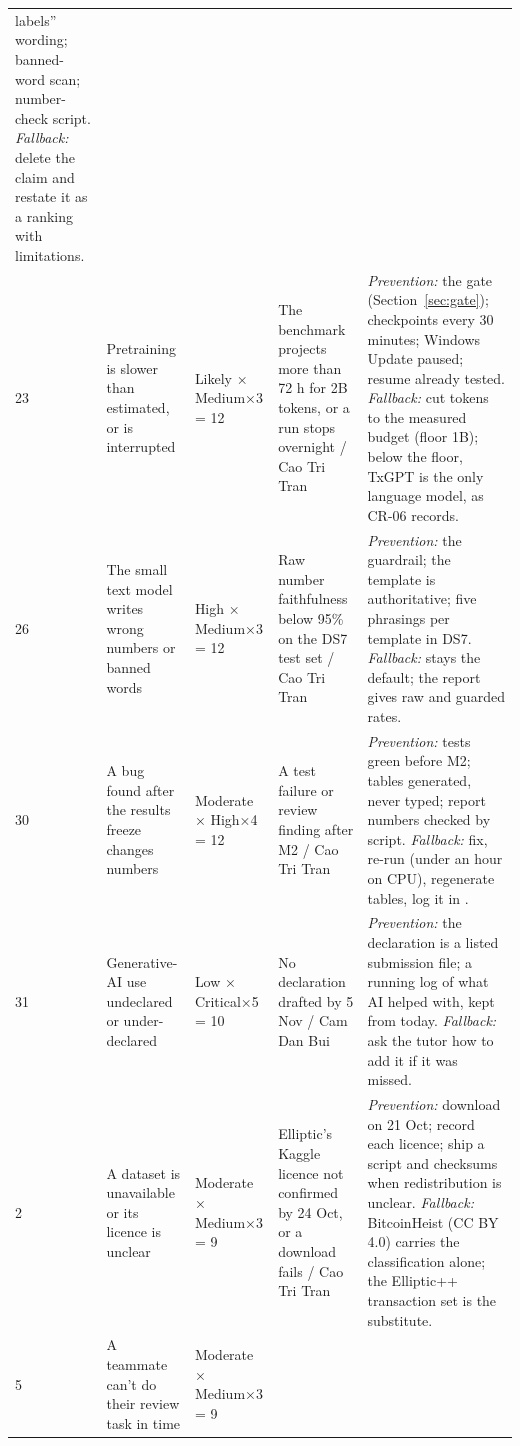 {\begin{longtable}{@{}L{0.7cm}L{3.2cm}L{2.0cm}L{3.4cm}L{4.6cm}@{}}
labels'' wording; banned-word scan; number-check script. \textit{Fallback:} delete the claim and
restate it as a ranking with limitations. \\
23 & Pretraining is slower than estimated, or is interrupted & Likely × Medium×3 = 12 &
The benchmark projects more than 72 h for 2B tokens, or a run stops overnight / Cao Tri Tran &
\textit{Prevention:} the gate (Section~\ref{sec:gate}); checkpoints every 30 minutes; Windows
Update paused; resume already tested. \textit{Fallback:} cut tokens to the measured budget (floor
1B); below the floor, TxGPT is the only language model, as CR-06 records. \\
26 & The small text model writes wrong numbers or banned words & High × Medium×3 = 12 &
Raw number faithfulness below 95\% on the DS7 test set / Cao Tri Tran &
\textit{Prevention:} the guardrail; the template is authoritative; five phrasings per template in
DS7. \textit{Fallback:}  stays the default; the report gives raw and
guarded rates. \\
30 & A bug found after the results freeze changes numbers & Moderate × High×4 = 12 &
A test failure or review finding after M2 / Cao Tri Tran &
\textit{Prevention:} tests green before M2; tables generated, never typed; report numbers checked
by script. \textit{Fallback:} fix, re-run  (under an hour on CPU), regenerate
tables, log it in . \\
31 & Generative-AI use undeclared or under-declared & Low × Critical×5 = 10 &
No declaration drafted by 5 Nov / Cam Dan Bui &
\textit{Prevention:} the declaration is a listed submission file; a running log of what AI helped
with, kept from today. \textit{Fallback:} ask the tutor how to add it if it was missed. \\
2 & A dataset is unavailable or its licence is unclear & Moderate × Medium×3 = 9 &
Elliptic's Kaggle licence not confirmed by 24 Oct, or a download fails / Cao Tri Tran &
\textit{Prevention:} download on 21 Oct; record each licence; ship a script and checksums when
redistribution is unclear. \textit{Fallback:} BitcoinHeist (CC BY 4.0) carries the classification
alone; the Elliptic++ transaction set is the substitute. \\
5 & A teammate can't do their review task in time & Moderate × Medium×3 = 9 &

\end{longtable}}
